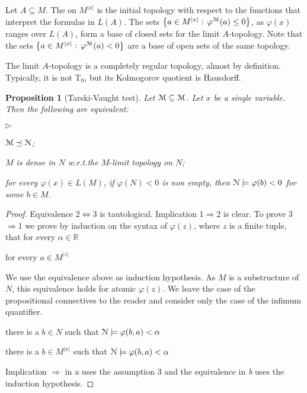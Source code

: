 \documentclass[12pt,letterpaper,oneside,reqno]{amsart}
\newcommand{\mylabel}[1]{{#1}\hfill}
\renewenvironment{itemize}
  {\begin{list}{$\triangleright$}{%
   \setlength{\parskip}{0mm}
   \setlength{\topsep}{.2\baselineskip}
   \setlength{\rightmargin}{0mm}
   \setlength{\listparindent}{0mm}
   \setlength{\itemindent}{0mm}
   \setlength{\labelwidth}{3ex}
   \setlength{\itemsep}{.2\baselineskip}
   \setlength{\parsep}{.2\baselineskip}
   \setlength{\partopsep}{0mm}
   \setlength{\labelsep}{1ex}
   \setlength{\leftmargin}{\labelwidth+\labelsep}
   \let\makelabel\mylabel}}{%
   \end{list}}
\theoremstyle{plain}
\newtheorem{proposition}[theorem]{Proposition}
\theoremstyle{remark}
\renewcommand*{\emph}[1]{%
   \smash{\tikz[baseline]\node[rectangle, fill=olive!25, rounded corners, inner xsep=0.5ex, inner ysep=0.2ex, anchor=base, minimum height = 2.7ex]{#1};}}
\begin{document}
Let $A\subseteq M$.
The \emph{limit $A$-topology\/} on $M^{|x|}$ is the initial topology with respect to the functions that interpret the formulas in $L(A)$.
The sets $\big\{a\in M^{|x|}:\, \varphi^{\EuScript M}(a)\le0\big\}$, as $\varphi(x)$ ranges over $L(A)$, form a base of closed sets for the limit $A$-topology.
Note that the sets $\big\{a\in M^{|x|}:\, \varphi^{\EuScript M}(a)<0\big\}$ are a base of open sets of the same topology.

The limit $A$-topology is a completely regular topology, almost by definition.
Typically, it is not T$_0$, but its Kolmogorov quotient is Hausdorff.

\begin{proposition}[Tarski-Vaught test]\label{prop_Tarski-Vaught} Let ${\EuScript M}\subseteq{\EuScript M}$.
  Let $x$ be a single variable.
  Then the following are equivalent:
  \begin{itemize}
    \item[1.] ${\EuScript M}\preceq{\EuScript N}$;
    \item[2.] $M$ is dense in $N$ w.r.t.\@ the $M\mbox{-}$limit topology on $N$;
    \item[3.] for every $\varphi(x)\in L(M)$, if $\varphi(N)<0$ is non empty, then ${\EuScript N}\models\varphi(b)<0$ for some $b\in M$.
  \end{itemize}
\end{proposition}
\begin{proof}
  Equivalence 2$\Leftrightarrow$3 is tautological.
  Implication 1$\Rightarrow$2 is clear.
  To prove 3$\Rightarrow$1 we prove by induction on the syntax of $\varphi(z)$, where $z$ is a finite tuple, that for every $\alpha\in{\mathds R}$

   \hfill for every $a\in M^{|z|}$

  We use the equivalence above as induction hypothesis.
  As $M$ is a substructure of $N$, this equivalence holds for atomic $\varphi(z)$.
  We leave the case of the propositional connectives to the reader and consider only the case of the infimum quantifier.

   there is a $b\in N$ such that ${\EuScript N}\models\varphi(b,a)<\alpha$

   there is a $b\in M^{|x|}$ such that ${\EuScript N}\models\varphi(b,a)<\alpha$


  Implication $\Rightarrow$ in \textit{a} uses the assumption 3 and the equivalence in \textit{b} uses the induction hypothesis.
\end{proof}
\end{document}
